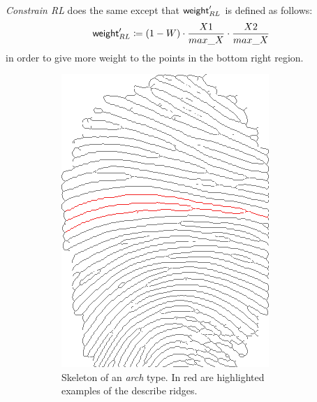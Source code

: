 \documentclass[8pt]{article}
\begin{document}
\emph{Constrain RL} does the same except that $\textsf{weight}_{RL}^\prime$ is
defined as follows:
  \begin{align*}
    \textsf{weight}_{RL}^\prime \coloneqq 
      (1-W)\cdot \frac{X1}{max\_X} \cdot \frac{X2}{max\_X}
  \end{align*}
in order to give more weight to the points in the bottom right region.
\begin{figure}
	\centering
   	\begin{subfigure}{.48\textwidth}
   			\centering
	\includegraphics[width=0.9\linewidth]{img/arch}
	\caption{Skeleton of an \textit{arch} type. In red are highlighted examples of the describe ridges.}
	\label{fig:arch}
\end{subfigure}%
\hfill
\begin{subfigure}{.48\textwidth}
	\centering

\end{subfigure}
\end{figure}
\end{document}
